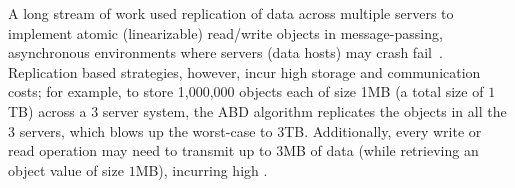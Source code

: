 		
%	
%	
%

A long stream of work used replication of data across multiple servers to implement atomic (linearizable) read/write objects in message-passing, asynchronous environments where servers (data hosts) may crash fail~\cite{FNP15, ABD96, CDGL04,  FL03,  FHN16,   GNS08,  GNS09, LS97}.  
Replication based strategies, however, incur high storage and communication costs; for example, to store 1,000,000 objects each of size 1MB (a total size of $1$TB) across a $3$ server system, the ABD algorithm replicates the objects in all the $3$ servers,  which blows up the worst-case  to $3$TB. Additionally, every write or read operation may need to transmit up to $3$MB of data (while retrieving an object value of size $1$MB), incurring high . 


